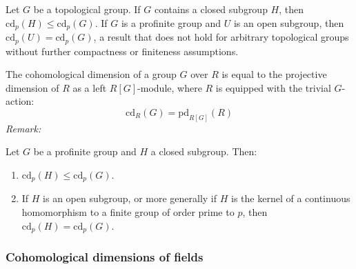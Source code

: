 \begin{proposition}
Let $G$ be a topological group. If $G$ contains a closed subgroup $H$, then $\text{cd}_p(H) \leq \text{cd}_p(G)$. If $G$ is a profinite group and $U$ is an open subgroup, then $\text{cd}_p(U) = \text{cd}_p(G)$, a result that does not hold for arbitrary topological groups without further compactness or finiteness assumptions.
\end{proposition}





\begin{proposition}
The cohomological dimension of a group $G$ over $R$ is equal to the projective dimension of $R$ as a left $R[G]$-module, where $R$ is equipped with the trivial $G$-action:
$$\text{cd}_R(G) = \text{pd}_{R[G]}(R)$$
\textit{Remark:} 
\end{proposition}

\begin{theorem}
Let $G$ be a profinite group and $H$ a closed subgroup. Then:
\begin{enumerate}
    \item $\text{cd}_p(H) \leq \text{cd}_p(G)$.
    \item If $H$ is an open subgroup, or more generally if $H$ is the kernel of a continuous homomorphism to a finite group of order prime to $p$, then $\text{cd}_p(H) = \text{cd}_p(G)$.
\end{enumerate}
\end{theorem}

\subsubsection{Cohomological dimensions of fields}

